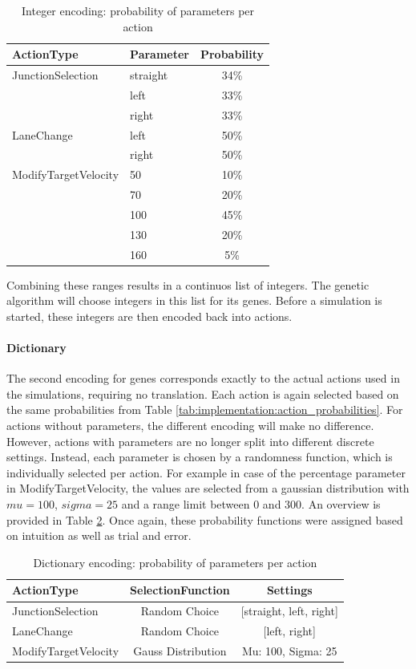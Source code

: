 \begin{table}[ht]
	\centering
	\begin{tabular}{llc}
		\hline
		ActionType & Parameter & Probability \\
		\hline
		JunctionSelection 	& straight & 34\% \\
		& left & 33\% \\
		& right & 33\% \\
		\hline
		LaneChange 			& left & 50\% \\
		& right & 50\% \\
		\hline
		ModifyTargetVelocity & 50 & 10\%\\
		& 70 & 20\%\\
		& 100 & 45\%\\
		& 130 & 20\%\\
		& 160 & 5\%\\
		\hline
	\end{tabular}
	\caption{Integer encoding: probability of parameters per action}
	\label{tab:implementation:integer_encoding_probabilities}
\end{table}

Combining these ranges results in a continuos list of integers. The genetic algorithm will choose integers in this list for its genes. Before a simulation is started, these integers are then encoded back into actions.

\paragraph{Dictionary}
The second encoding for genes corresponds exactly to the actual actions used in the simulations, requiring no translation. Each action is again selected based on the same probabilities from Table \ref{tab:implementation:action_probabilities}. For actions without parameters, the different encoding will make no difference. However, actions with parameters are no longer split into different discrete settings. Instead, each parameter is chosen by a randomness function, which is individually selected per action. For example in case of the percentage parameter in ModifyTargetVelocity, the values are selected from a gaussian distribution with $mu=100$, $sigma=25$ and a range limit between 0 and 300. An overview is provided in Table \ref{tab:implementation:dict_encoding_probabilities}.
Once again, these probability functions were assigned based on intuition as well as trial and error. 

\begin{table}[ht]
	\centering
	\begin{tabular}{lcc}
		\hline
		ActionType & SelectionFunction & Settings \\
		\hline
		JunctionSelection 	& Random Choice & [straight, left, right] \\
		LaneChange 			& Random Choice & [left, right]\\
		ModifyTargetVelocity & Gauss Distribution & Mu: 100, Sigma: 25\\
		\hline
	\end{tabular}
	\caption{Dictionary encoding: probability of parameters per action}
	\label{tab:implementation:dict_encoding_probabilities}
\end{table}

